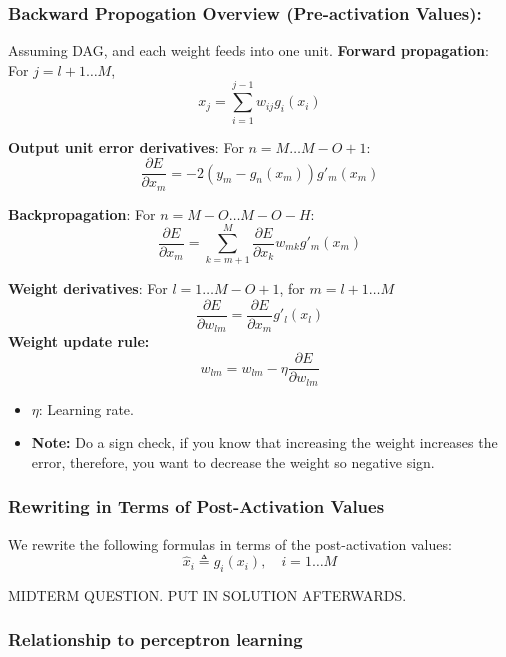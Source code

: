 \subsubsection{Backward Propogation Overview (Pre-activation Values):}
\begin{definition}
    Assuming DAG, and each weight feeds into one unit.
    \textbf{Forward propagation}:
    For $j = l+1 \dots M$, 
    \[
    x_j = \sum_{i=1}^{j-1} w_{ij} g_i(x_i)
    \]

    \textbf{Output unit error derivatives}:
    For $n = M \dots M-O+1$:
    \[
    \frac{\partial E}{\partial x_m} = -2(y_m - g_n(x_m)) g'_m(x_m)
    \]

    \textbf{Backpropagation}:
    For $n = M-O \dots M-O-H$:
    \[
    \frac{\partial E}{\partial x_m} = \sum_{k=m+1}^{M} \frac{\partial E}{\partial x_k} w_{mk} g'_m(x_m)
    \]

    \textbf{Weight derivatives}:
    For $l = 1 \dots M-O+1$, for $m = l+1 \dots M$
    \[
    \frac{\partial E}{\partial w_{lm}} = \frac{\partial E}{\partial x_m} g'_l(x_l)
    \]
    \textbf{Weight update rule:}
    \[
    w_{lm} = w_{lm} - \eta \frac{\partial E}{\partial w_{lm}}
    \]
    \begin{itemize}
        \item $\eta$: Learning rate.
        \item \textbf{Note:} Do a sign check, if you know that increasing the weight increases the error, therefore, you want to decrease the weight so negative sign. 
    \end{itemize}
\end{definition}

\subsubsection{Rewriting in Terms of Post-Activation Values}
\begin{derivation} 
    We rewrite the following formulas in terms of the post-activation values:
    \[
    \hat{x}_i \triangleq g_i(x_i), \quad i = 1 \dots M
    \]
    
    MIDTERM QUESTION. PUT IN SOLUTION AFTERWARDS.

\end{derivation}

\subsubsection{Relationship to perceptron learning}
\begin{intuition}
\end{intuition}

